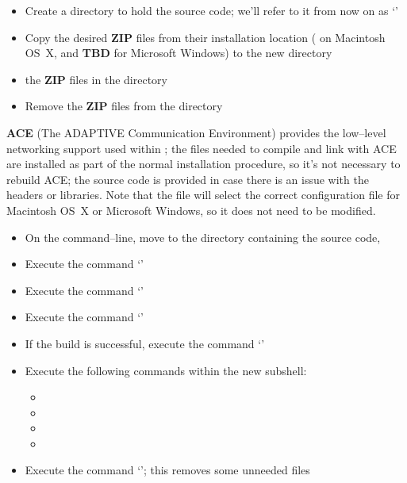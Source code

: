 \tertiaryEnd{}
\secondaryEnd{}
\begin{itemize}
\item Create a directory to hold the source code; we'll refer to it from now on as
`'
\item Copy the desired \textbf{ZIP} files from their installation location
( on Macintosh OS~X, and \textbf{TBD} for Microsoft Windows) to the
new directory 
\item {} the \textbf{ZIP} files in the directory 
\item Remove the \textbf{ZIP} files from the  directory
\end{itemize}
\secondaryEnd{}
\textbf{ACE} (The ADAPTIVE Communication Environment) provides the low--level networking
support used within \mplusm{}; the files needed to compile and link with ACE are installed
as part of the normal \mplusm{} installation procedure, so it's not necessary to rebuild
ACE; the source code is provided in case there is an issue with the headers or libraries.
Note that the file  will select the correct
configuration file for Macintosh OS~X or Microsoft Windows, so it does not need to be
modified.
\begin{itemize}
\item On the command--line, move to the directory containing the \mplusm{} source code,
\item Execute the command `'
\item Execute the command `'
\item Execute the command `'
\item If the build is successful, execute the command `'
\item Execute the following commands within the new subshell:
\begin{itemize}
\item {}
\item {}
\item {}
\item {}
\end{itemize}
\item Execute the command `'; this removes some unneeded
files
\end{itemize}
